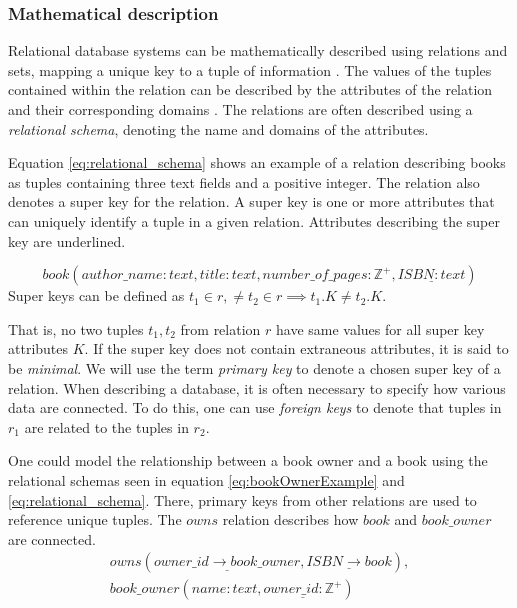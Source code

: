 \subsubsection*{Mathematical description}
Relational database systems can be mathematically described using relations and sets, mapping a unique key to a tuple of information \cite[Chapter~2.3]{DBSBook}.
The values of the tuples contained within the relation can be described by the attributes of the relation and their corresponding domains \cite{KatjaFirstPP}. 
The relations are often described using a \textit{relational schema}, denoting the name and domains of the attributes.

Equation \ref{eq:relational_schema} shows an example of a relation describing books as tuples containing three text fields and a positive integer.
The relation also denotes a super key for the relation. A super key is one or more attributes that can uniquely identify a tuple in a given relation. Attributes describing the super key are underlined.

\begin{equation} \label{eq:relational_schema}
    book(author\_name:text, title: text, number\_of\_pages:\mathbb{Z}^+, \underline{ISBN: text})
\end{equation}
Super keys can be defined as $t_1 \in r,\neq t_2 \in r \implies t_1.K \neq t_2.K$. 

That is, no two tuples $t_1, t_2$ from relation $r$ have same values for all super key attributes $K$. 
If the super key does not contain extraneous attributes, it is said to be \textit{minimal}. \cite[Chapter 2.3]{DBSBook}
We will use the term \textit{primary key} to denote a chosen super key of a relation. 
When describing a database, it is often necessary to specify how various data are connected. 
To do this, one can use \textit{foreign keys} to denote that tuples in $r_1$ are related to the tuples in $r_2$.


One could model the relationship between a book owner and a book using the relational schemas seen in equation \ref{eq:bookOwnerExample} and \ref{eq:relational_schema}.
There, primary keys from other relations are used to reference unique tuples. The $owns$ relation describes how $book$ and $book\_owner$ are connected. 
\begin{equation}\label{eq:bookOwnerExample}
    \begin{split}
        owns(\underline{owner\_id \rightarrow book\_owner}, \underline{ISBN \rightarrow book}), \\
        book\_owner(name:text,\underline{owner\_id:\mathbb{Z}^+})
    \end{split}
\end{equation}

